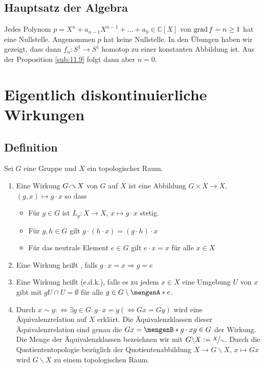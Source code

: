 \subsection{Hauptsatz der Algebra} %
\label{sub:1121}
Jedes Polynom $p = X^n + a_{n-1} X^{n-1} + \ldots  + a_0 \in \mathds{C}[X]$ von $\operatorname{grad} f = n \ge 1$ hat eine Nullstelle.
Angenommen $p$ hat keine Nullstelle. In den Übungen haben wir gezeigt, dass dann $f_n : S^1 \to S^1$ homotop zu einer konstanten Abbildung ist. Aus der Proposition 
\ref{sub:11.9} folgt dann aber $n=0$. \bewende
\newpage

\section{Eigentlich diskontinuierliche Wirkungen} %
\label{sec:12}

\subsection[Definition: Eigentlich diskontinuierliche Wirkung]{Definition} %
\label{sub:12.1}
Sei $G$ eine Gruppe und $X$ ein topologischer Raum.
\begin{enumerate}[(1)]
	\item Eine Wirkung $G \!\curvearrowright\! X$ von $G$ auf $X$ ist eine Abbildung $G \times X \to X$, $(g,x) \mapsto g \cdot x$ so dass
	\begin{itemize}
		\item Für $g \in G$ ist $L_g : X \to X$, $x \mapsto g \cdot x$ stetig.
		\item Für $g,h \in G$ gilt $g \cdot (h \cdot x)= (g \cdot h) \cdot x$
		\item Für das neutrale Element $e \in G$ gilt $e \cdot x = x$ für alle $x \in X$
	\end{itemize}
	\item Eine Wirkung heißt , falls $g \cdot x = x \Rightarrow g = e$
	\item Eine Wirkung heißt  (e.d.k.), falls es zu jedem $x \in X$ eine Umgebung $U$ von $x$
	gibt mit $g U\cap U = \emptyset$ für alle $g \in G \setminus \set{e}$.
	\item Durch $x \sim y :\Leftrightarrow \exists g \in G : g \cdot x = y (\Leftrightarrow G x = G y)$ wird eine 
	Äquivalenzrelation auf $X$ erklärt. Die Äquivalenzklassen dieser Äquivalenzrelation sind genau die  $Gx =\set[g\cdot x]{g \in G}$ der Wirkung.
	Die Menge der Äquivalenzklassen bezeichnen wir mit $G \backslash X := \nicefrac{X}{\sim}$. Durch die Quotiententopologie bezüglich der Quotientenabbildung $X \to G\backslash X$, $x \mapsto G x$ wird $G \backslash X$ zu einem topologischen Raum.
\end{enumerate}

